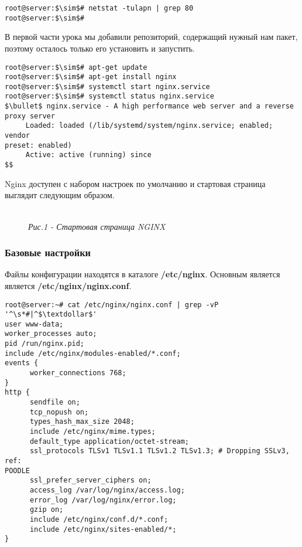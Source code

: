 \documentclass[14pt, a4paper]{article}
\begin{document}
\vspace{0.3cm}
\begin{lstlisting}
root@server:$\sim$# netstat -tulapn | grep 80
root@server:$\sim$#
\end{lstlisting}
\vspace{0.2cm}

В первой части урока мы добавили репозиторий, содержащий нужный нам пакет, поэтому осталось
только его установить и запустить.

\vspace{0.3cm}
\begin{lstlisting}
root@server:$\sim$# apt-get update
root@server:$\sim$# apt-get install nginx
root@server:$\sim$# systemctl start nginx.service
root@server:$\sim$# systemctl status nginx.service
$\bullet$ nginx.service - A high performance web server and a reverse proxy server
     Loaded: loaded (/lib/systemd/system/nginx.service; enabled; vendor 
preset: enabled)
     Active: active (running) since
$$
\end{lstlisting}
\vspace{0.2cm}

Nginx доступен с набором настроек по умолчанию и стартовая страница выглядит следующим
образом.

\begin{figure}[h]
    \centering
    \\ 
    \small\textit{Рис.1 - Стартовая страница NGINX}  
    \label{framework} 
\end{figure}

\subsubsection*{Базовые настройки} 

Файлы конфигурации находятся в каталоге \textbf{/etc/nginx}. Основным является является
\textbf{/etc/nginx/nginx.conf}.

\newpage

\begin{lstlisting}
root@server:~# cat /etc/nginx/nginx.conf | grep -vP '^\s*#|^$\textdollar$'
user www-data;
worker_processes auto;
pid /run/nginx.pid;
include /etc/nginx/modules-enabled/*.conf;
events {
      worker_connections 768;
}
http {
      sendfile on;
      tcp_nopush on;
      types_hash_max_size 2048;
      include /etc/nginx/mime.types;
      default_type application/octet-stream;
      ssl_protocols TLSv1 TLSv1.1 TLSv1.2 TLSv1.3; # Dropping SSLv3, ref: 
POODLE
      ssl_prefer_server_ciphers on;
      access_log /var/log/nginx/access.log;
      error_log /var/log/nginx/error.log;
      gzip on;
      include /etc/nginx/conf.d/*.conf;
      include /etc/nginx/sites-enabled/*;
}
\end{lstlisting}
\vspace{0.2cm}
\end{document}
